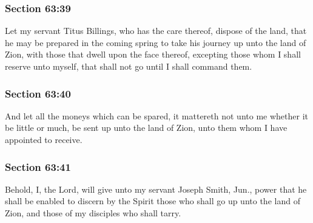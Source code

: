 	\subsubsection{Section 63:39} %
		\label{DC63-39}

		Let my servant Titus Billings, who has the care thereof, dispose of the land, that he may be prepared in the coming spring to take his journey up unto the land of Zion, with those that dwell upon the face thereof, excepting those whom I shall reserve unto myself, that shall not go until I shall command them.


	\subsubsection{Section 63:40} %
		\label{DC63-40}

		And let all the moneys which can be spared, it mattereth not unto me whether it be little or much, be sent up unto the land of Zion, unto them whom I have appointed to receive.


	\subsubsection{Section 63:41} %
		\label{DC63-41}

		Behold, I, the Lord, will give unto my servant Joseph Smith, Jun., power that he shall be enabled to discern by the Spirit those who shall go up unto the land of Zion, and those of my disciples who shall tarry.

